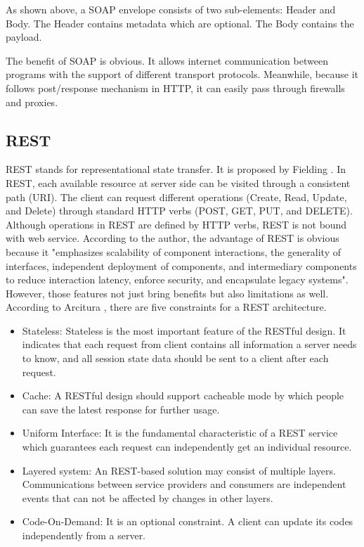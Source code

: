 \documentclass{Nan_Thesis}
\begin{document}
As shown above, a SOAP envelope consists of two sub-elements: Header and Body. The Header contains metadata which are optional. The Body contains the payload.

The benefit of SOAP is obvious. It allows internet communication between programs with the support of different transport protocols. Meanwhile, because it follows post/response mechanism in HTTP, it can easily pass through firewalls and proxies.

\subsection{REST}
REST stands for representational state transfer. It is proposed by Fielding \cite{fielding2000architectural}. In REST, each available resource at server side can be visited through a consistent path (URI). The client can request different operations (Create, Read, Update, and Delete) through standard HTTP verbs (POST, GET, PUT, and DELETE). Although operations in REST are defined by HTTP verbs, REST is not bound with web service. According to the author, the advantage of REST is obvious because it "emphasizes scalability of component interactions, the generality of interfaces, independent deployment of components, and intermediary components to reduce interaction latency, enforce security, and encapsulate legacy systems". However, those features not just bring benefits but also limitations as well. According to Arcitura \cite{arcitura2016}, there are five constraints for a REST architecture.

\begin{itemize}
  \item Stateless: Stateless is the most important feature of the RESTful design. It indicates that each request from client contains all information a server needs to know, and all session state data should be sent to a client after each request.
  \item Cache: A RESTful design should support cacheable mode by which people can save the latest response for further usage.  
  \item Uniform Interface: It is the fundamental characteristic of a REST service which guarantees each request can independently get an individual resource.
  \item Layered system: An REST-based solution may consist of multiple layers. Communications between service providers and consumers are independent events that can not be affected by changes in other layers.
  \item Code-On-Demand: It is an optional constraint. A client can update its codes independently from a server.  
\end{itemize}
 
\end{document}
